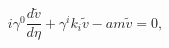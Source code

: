 \begin{equation}\label{eq:linearized}
  i\gamma^0 \frac{d\tilde{v}}{d\eta}
  +\gamma^i k_i \tilde{v}-a m \tilde{v}=0,
\end{equation}

